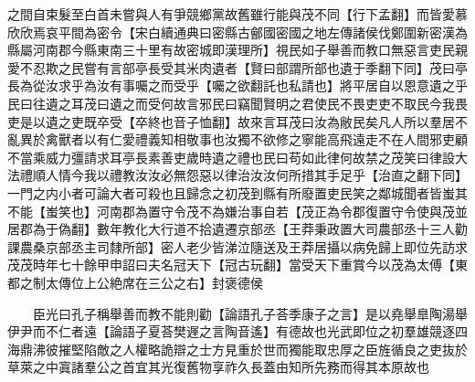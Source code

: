 之間自束髮至白首未嘗與人有爭競鄉黨故舊雖行能與茂不同【行下孟翻】而皆愛慕欣欣焉哀平間為密令【宋白續通典曰密縣古鄶國密國之地左傳諸侯伐鄭圍新密漢為縣屬河南郡今縣東南三十里有故密城即漢理所】視民如子舉善而教口無惡言吏民親愛不忍欺之民嘗有言部亭長受其米肉遺者【賢曰部謂所部也遺于季翻下同】茂曰亭長為從汝求乎為汝有事囑之而受乎【囑之欲翻託也私請也】將平居自以恩意遺之乎民曰往遺之耳茂曰遺之而受何故言邪民曰竊聞賢明之君使民不畏吏吏不取民今我畏吏是以遺之吏既卒受【卒終也音子恤翻】故來言耳茂曰汝為敝民矣凡人所以羣居不亂異於禽獸者以有仁愛禮義知相敬事也汝獨不欲修之寧能高飛遠走不在人間邪吏顧不當乘威力彊請求耳亭長素善吏歲時遺之禮也民曰苟如此律何故禁之茂笑曰律設大法禮順人情今我以禮教汝汝必無怨惡以律治汝汝何所措其手足乎【治直之翻下同】一門之内小者可論大者可殺也且歸念之初茂到縣有所廢置吏民笑之鄰城聞者皆蚩其不能【蚩笑也】河南郡為置守令茂不為嫌治事自若【茂正為令郡復置守令使與茂並居郡為于偽翻】數年教化大行道不拾遺遷京部丞【王莽秉政置大司農部丞十三人勸課農桑京部丞主司隸所部】密人老少皆涕泣隨送及王莽居攝以病免歸上即位先訪求茂茂時年七十餘甲申詔曰夫名冠天下【冠古玩翻】當受天下重賞今以茂為太傅【東都之制太傳位上公絶席在三公之右】封褒德侯

　　臣光曰孔子稱舉善而教不能則勸【論語孔子荅季康子之言】是以堯舉臯陶湯舉伊尹而不仁者遠【論語子夏荅樊遟之言陶音遙】有德故也光武即位之初羣雄競逐四海鼎沸彼摧堅陷敵之人權略詭辯之士方見重於世而獨能取忠厚之臣旌循良之吏抜於草萊之中寘諸羣公之首宜其光復舊物享祚久長蓋由知所先務而得其本原故也


